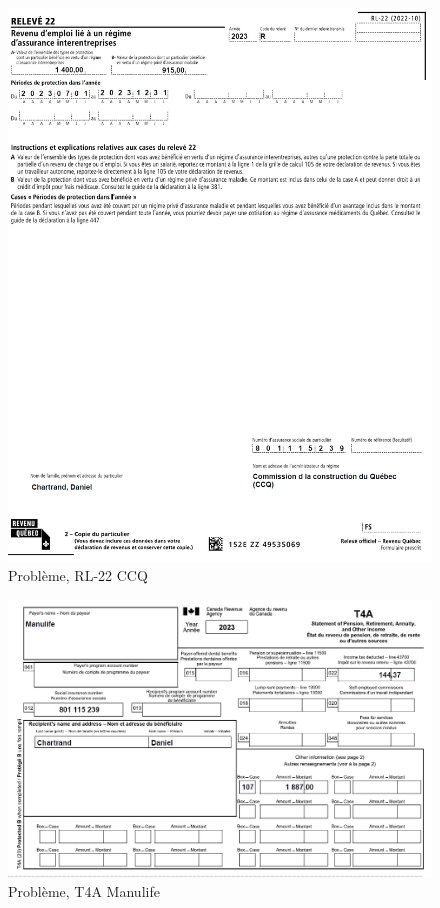 \begin{figure}
	\centering
	\includegraphics[width=.9\textwidth]{probleme/chapitre-2/RL22-CCQ.png}
	\caption[]{Problème, RL-22 CCQ}
	\label{fig:Chap2RL22CCQ}
\end{figure}

\begin{figure}
	\centering
	\includegraphics[width=.9\textwidth]{probleme/chapitre-2/T4A-Manulife.png}
	\caption[]{Problème, T4A Manulife}
	\label{fig:Chap2T4AManulife}
\end{figure}

